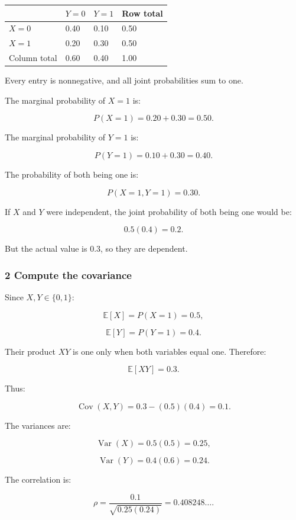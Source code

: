 {\def\LTcaptype{none} %
\begin{longtable}[]{@{}llll@{}}
\toprule\noalign{}
& \(Y=0\) & \(Y=1\) & Row total \\
\midrule\noalign{}
\endhead
\bottomrule\noalign{}
\endlastfoot
\(X=0\) & 0.40 & 0.10 & 0.50 \\
\(X=1\) & 0.20 & 0.30 & 0.50 \\
Column total & 0.60 & 0.40 & 1.00 \\
\end{longtable}
}

Every entry is nonnegative, and all joint probabilities sum to one.

The marginal probability of \(X=1\) is:

\[
 P(X=1)=0.20+0.30=0.50.
\]

The marginal probability of \(Y=1\) is:

\[
 P(Y=1)=0.10+0.30=0.40.
\]

The probability of both being one is:

\[
 P(X=1,Y=1)=0.30.
\]

If \(X\) and \(Y\) were independent, the joint probability of both being one would be:

\[
 0.5(0.4)=0.2.
\]

But the actual value is \(0.3\), so they are dependent.

\subsubsection{2 Compute the covariance}\label{02-foundations-ii-ch023-compute-the-covariance}

Since \(X,Y\in\{0,1\}\):

\[
 \mathbb E[X]=P(X=1)=0.5,
\]

\[
 \mathbb E[Y]=P(Y=1)=0.4.
\]

Their product \(XY\) is one only when both variables equal one. Therefore:

\[
 \mathbb E[XY]=0.3.
\]

Thus:

\[
 \operatorname{Cov}(X,Y) = 0.3-(0.5)(0.4) =\boxed{0.1}.
\]

The variances are:

\[
 \operatorname{Var}(X)=0.5(0.5)=0.25,
\]

\[
 \operatorname{Var}(Y)=0.4(0.6)=0.24.
\]

The correlation is:

\[
 \rho= \frac{0.1}{\sqrt{0.25(0.24)}} =\boxed{0.408248\ldots}.
\]


